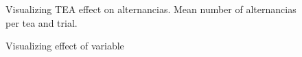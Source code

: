 \documentclass{article}
\begin{document}
\begin{figure}[H]
  \caption{Visualizing TEA effect on alternancias. Mean number of alternancias per tea and trial.}
  \noindent{}
  \centering
\end{figure}

\begin{figure}[H]
  \caption{Visualizing effect of variable}
  \noindent{}
  \centering
\end{figure}
\end{document}
